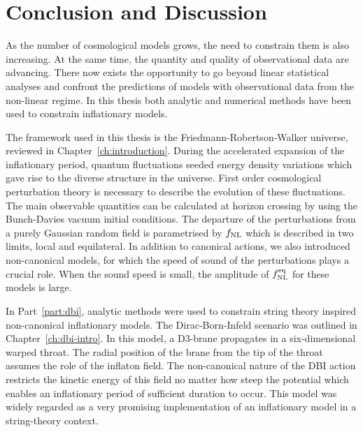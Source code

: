 \renewcommand{\CVSrevision}%
{\version$Id: theend.tex,v 1.14 2009/11/20 11:33:59 ith Exp $}

\chapter{Conclusion and Discussion}
\label{ch:conclusions}

As the number of cosmological models grows, the need to constrain them is also
increasing. At the same time, the quantity and quality of observational data are
advancing. There now exists the opportunity to go beyond linear statistical analyses
and confront the predictions of models with observational data from the non-linear
regime. In this thesis both analytic and numerical methods have been used to
constrain inflationary models.

The framework used in this thesis is the Friedmann-Robertson-Walker universe,
reviewed in Chapter~\ref{ch:introduction}. During the accelerated expansion of the
inflationary period, quantum fluctuations seeded energy density variations which
gave rise to the diverse structure in the universe. First order
cosmological perturbation theory
is necessary to describe the evolution of these fluctuations. The main observable
quantities can be calculated at horizon crossing by using the Bunch-Davies vacuum
initial conditions. The departure of the perturbations from a purely Gaussian random
field is parametrised by $f_{\mathrm{NL}}$ which is described in two limits, local and
equilateral. 
In addition to canonical actions, we also introduced
non-canonical models, for which the speed of sound of the perturbations plays a
crucial role. When the sound speed is small, the amplitude of $f_{\mathrm{NL}}^{\mathrm{eq}}$ for these
models is large. 



In Part~\ref{part:dbi}, analytic methods were used to constrain
string theory inspired non-canonical inflationary models. The Dirac-Born-Infeld
scenario was
outlined in Chapter~\ref{ch:dbi-intro}. In this model, a D3-brane propagates in a
six-dimensional warped throat. The radial position of the brane from the tip of the
throat assumes the role of the inflaton field. The non-canonical nature of the DBI
action restricts the kinetic energy of this field no matter how steep the potential
which enables an inflationary period of sufficient duration to occur.
This model was widely regarded as a very promising implementation of an inflationary
model in a string-theory context.

